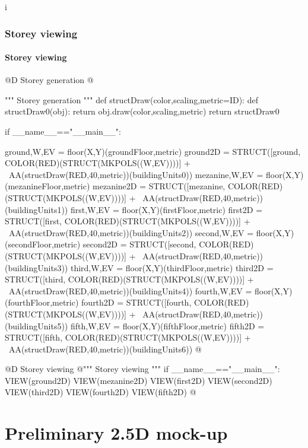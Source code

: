 i\documentclass[11pt,oneside]{article}    %
\begin{document}
\subsubsection{Storey viewing}

\paragraph{Storey viewing}
@D Storey generation
@{""" Storey generation """
def structDraw(color,scaling,metric=ID):
    def structDraw0(obj): return obj.draw(color,scaling,metric)
    return structDraw0

if __name__=="__main__":
    
    ground,W,EV = floor(X,Y)(groundFloor,metric)
    ground2D = STRUCT([ground, COLOR(RED)(STRUCT(MKPOLS((W,EV))))] + \
                AA(structDraw(RED,40,metric))(buildingUnits0))
    mezanine,W,EV = floor(X,Y)(mezanineFloor,metric)
    mezanine2D = STRUCT([mezanine, COLOR(RED)(STRUCT(MKPOLS((W,EV))))] + \
                AA(structDraw(RED,40,metric))(buildingUnits1))
    first,W,EV = floor(X,Y)(firstFloor,metric)
    first2D = STRUCT([first, COLOR(RED)(STRUCT(MKPOLS((W,EV))))] + \
                AA(structDraw(RED,40,metric))(buildingUnits2))
    second,W,EV = floor(X,Y)(secondFloor,metric)
    second2D = STRUCT([second, COLOR(RED)(STRUCT(MKPOLS((W,EV))))] + \
                AA(structDraw(RED,40,metric))(buildingUnits3))
    third,W,EV = floor(X,Y)(thirdFloor,metric)
    third2D = STRUCT([third, COLOR(RED)(STRUCT(MKPOLS((W,EV))))] + \
                AA(structDraw(RED,40,metric))(buildingUnits4))
    fourth,W,EV = floor(X,Y)(fourthFloor,metric)
    fourth2D = STRUCT([fourth, COLOR(RED)(STRUCT(MKPOLS((W,EV))))] + \
                AA(structDraw(RED,40,metric))(buildingUnits5))
    fifth,W,EV = floor(X,Y)(fifthFloor,metric)
    fifth2D = STRUCT([fifth, COLOR(RED)(STRUCT(MKPOLS((W,EV))))] + \
                AA(structDraw(RED,40,metric))(buildingUnits6))
@}

@D Storey viewing
@{""" Storey viewing """
if __name__=="__main__":
    VIEW(ground2D)
    VIEW(mezanine2D)
    VIEW(first2D)
    VIEW(second2D)
    VIEW(third2D)
    VIEW(fourth2D)
    VIEW(fifth2D)
@}


\section{Preliminary 2.5D mock-up}
\end{document}
